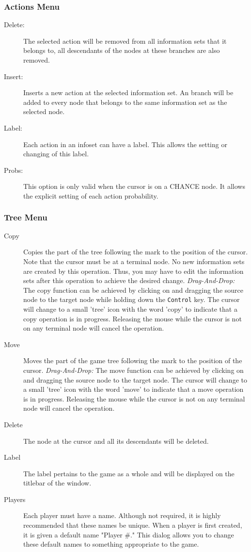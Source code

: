 \subsubsection{Actions Menu}
\begin{description}
\item[Delete:]  The selected action will be removed from all information sets 
that it belongs to, all descendants of the nodes at these branches are also removed. 
\item[Insert:]  Inserts a new action at the selected information set.  An branch 
will be added to every node that belongs to the same information set as the 
selected node. 
\item[Label:]  Each action in an infoset can have a label. 
This allows the setting or changing of this label. 
\item[Probs:]  This option is only valid when the cursor is on a
CHANCE node.  It allows the explicit setting of each action probability.
\end{description}

\subsubsection{Tree Menu}
\begin{description}
\item[Copy] Copies the part of the tree following the mark to the 
position of the cursor.  Note that the cursor must be at a terminal node.  No 
new information sets are created by this operation.  Thus, you may have to edit the 
information sets after this operation to achieve the desired change. 
{\em Drag-And-Drop:} The copy function can be achieved by clicking on and
dragging the source node to the target node while holding down the {\tt Control}
 key.  The cursor will change to a small 'tree' icon with the word 'copy'
to indicate that a copy operation is in progress.  Releasing the mouse while
the cursor is not on any terminal node will cancel the operation.
\item[Move] Moves the part of the game tree following the mark to the position of 
the cursor.  
{\em Drag-And-Drop:} The move function can be achieved by clicking on and
dragging the source node to the target node. The cursor will change to a small
 'tree' icon with the word 'move'
to indicate that a move operation is in progress.  Releasing the mouse while
the cursor is not on any terminal node will cancel the operation.
\item[Delete]  The node at the cursor and all its descendants will be deleted.
\item[Label]  The label pertains to the game as a whole and will be
displayed on the titlebar of the window.
\item[Players]  Each player must have a name.  Although not required, it
is highly recommended that these names be unique.  When a player is first
created, it is given a default name "Player \#."  This dialog allows you to
change these default names to something appropriate to the game.
\end{description}

